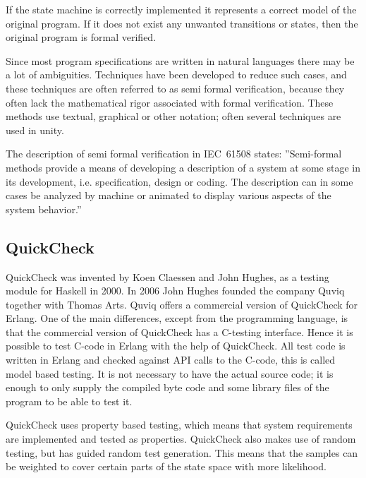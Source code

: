 If the state machine is correctly implemented it represents a correct
model of the original program. If it does not exist any unwanted
transitions or states, then the original program is formal verified.

Since most program specifications are written in natural languages
there may be a lot of ambiguities. Techniques have been developed to
reduce such cases, and these techniques are often referred to as semi
formal verification, because they often lack the mathematical rigor
associated with formal verification. These methods use textual,
graphical or other notation; often several techniques are used in
unity. \cite[p.91]{COURSEBOOK:safety-critical}

The description of semi formal verification in IEC~61508 states:
''Semi-formal methods provide a means of developing a description of a
system at some stage in its development, i.e. specification, design or
coding. The description can in some cases be analyzed by machine or
animated to display various aspects of the system behavior.'' \cite[p.77]{IEC61508}


\subsection{QuickCheck}
QuickCheck was invented by Koen Claessen and John Hughes, as a testing
module for Haskell in 2000. In 2006 John Hughes founded the company
Quviq together with Thomas Arts. Quviq offers a commercial version of
QuickCheck for Erlang. One of the main differences, except from the
programming language, is that the commercial version of QuickCheck has
a C-testing interface. Hence it is possible to test C-code in Erlang with
the help of QuickCheck. All test code is written in Erlang and checked
against API calls to the C-code, this is called model based
testing. It is not necessary to have the actual source code; it is
enough to only supply the compiled byte code and some library files of
the program to be able to test
it. \cite{QUVIQ:about}\cite{QUICKCHECK:manual}

QuickCheck uses property based testing, which means that system
requirements are implemented and tested as properties. QuickCheck
also makes use of random testing, but has guided random test
generation. This means that the samples can be weighted to cover
certain parts of the state space with more likelihood.
\cite{QUICKCHECK:manual}
